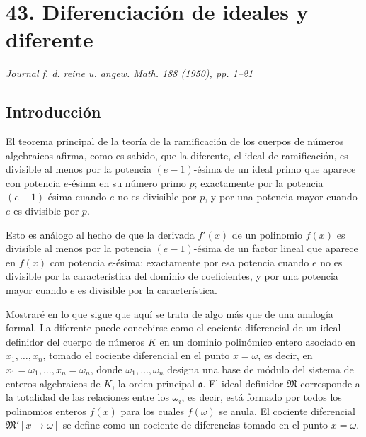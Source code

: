 
\clearpage

\section*{43. Diferenciación de ideales y diferente}

\begin{center}
\emph{Journal f. d. reine u. angew. Math. 188 (1950), pp. 1--21}
\end{center}

\subsection*{Introducción}

El teorema principal de la teoría de la ramificación de los cuerpos de números algebraicos afirma, como es sabido, que la diferente, el ideal de ramificación, es divisible al menos por la potencia $(e-1)$-ésima de un ideal primo que aparece con potencia $e$-ésima en su número primo $p$; exactamente por la potencia $(e-1)$-ésima cuando $e$ no es divisible por $p$, y por una potencia mayor cuando $e$ es divisible por $p$.

Esto es análogo al hecho de que la derivada $f'(x)$ de un polinomio $f(x)$ es divisible al menos por la potencia $(e-1)$-ésima de un factor lineal que aparece en $f(x)$ con potencia $e$-ésima; exactamente por esa potencia cuando $e$ no es divisible por la característica del dominio de coeficientes, y por una potencia mayor cuando $e$ es divisible por la característica.

Mostraré en lo que sigue que aquí se trata de algo más que de una analogía formal. La diferente puede concebirse como el cociente diferencial de un ideal definidor del cuerpo de números $K$ en un dominio polinómico entero asociado en $x_1,\ldots,x_n$, tomado el cociente diferencial en el punto $x=\omega$, es decir, en $x_1=\omega_1,\ldots,x_n=\omega_n$, donde $\omega_1,\ldots,\omega_n$ designa una base de módulo del sistema de enteros algebraicos de $K$, la orden principal $\mathfrak o$. El ideal definidor $\mathfrak M$ corresponde a la totalidad de las relaciones entre los $\omega_i$, es decir, está formado por todos los polinomios enteros $f(x)$ para los cuales $f(\omega)$ se anula. El cociente diferencial $\mathfrak M'[x\to\omega]$ se define como un cociente de diferencias tomado en el punto $x=\omega$.

